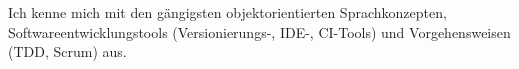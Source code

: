 		Ich kenne mich mit den gängigsten objektorientierten Sprachkonzepten, Softwareentwicklungstools (Versionierungs-, IDE-, CI-Tools) und Vorgehensweisen (TDD, Scrum) aus.
